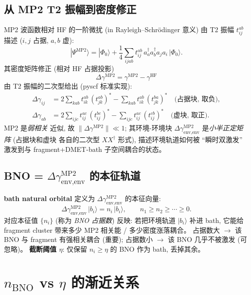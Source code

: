 \documentclass[11pt]{article}
\begin{document}
\subsection*{从 MP2 T2 振幅到密度修正}
MP2 波函数相对 HF 的一阶微扰 (in Rayleigh--Schr\"odinger 意义) 由
T2 振幅 $t_{ij}^{ab}$ 描述 ($i,j$ 占据, $a,b$ 虚):
\[
  |\Psi^{\text{MP2}}\rangle = |\Phi_0\rangle + \frac{1}{4}\sum_{ijab} t_{ij}^{ab}\,
  a^\dagger_a a^\dagger_b a_j a_i\,|\Phi_0\rangle .
\]
其密度矩阵修正 (相对 HF 占据投影)
\[
  \Delta\gamma^{\text{MP2}}
  = \gamma^{\text{MP2}}-\gamma^{\text{HF}}
\]
由 T2 振幅的二次型给出 (pyscf 标准实现):
\begin{align}
  \Delta\gamma_{ij}  &= 2\sum_{kab} t_{ik}^{ab}\,(t_{jk}^{ab})^*
                    - \sum_{kab} t_{ik}^{ab}\,(t_{jk}^{ba})^*  \quad \text{(占据块, 取负)},\\
  \Delta\gamma_{ab}  &= 2\sum_{ijc} t_{ij}^{ac}\,(t_{ij}^{bc})^*
                    - \sum_{ijc} t_{ij}^{ac}\,(t_{ij}^{cb})^*  \quad \text{(虚块, 取正)}.
\end{align}
MP2 是\emph{弱相关} 近似, 故 $\|\Delta\gamma^{\text{MP2}}\|\ll 1$; 其环境-环境块
$\Delta\gamma^{\text{MP2}}_{\text{env,env}}$ 是\emph{小半正定矩阵} (占据块和虚块
各自的二次型 $XX^\dagger$ 形式), 描述环境轨道如何被 ``瞬时双激发'' 激发到与
fragment+DMET-bath 子空间耦合的状态。

\subsection*{BNO = $\Delta\gamma^{\text{MP2}}_{\text{env,env}}$ 的本征轨道}
\textbf{bath natural orbital} 定义为 $\Delta\gamma^{\text{MP2}}_{\text{env,env}}$
的本征向量:
\[
  \Delta\gamma^{\text{MP2}}_{\text{env,env}}\,|b_i\rangle = n_i\,|b_i\rangle,
  \qquad n_1\ge n_2\ge\cdots\ge 0.
\]
对应本征值 $\{n_i\}$ (称为 \emph{BNO 占据数}) 反映: 若把环境轨道 $|b_i\rangle$
补进 bath, 它能给 fragment cluster 带来多少 MP2 相关能 / 多少密度涨落耦合。
占据数大 $\to$ 该 BNO 与 fragment 有强相关耦合 (重要);
占据数小 $\to$ 该 BNO 几乎不被激发 (可忽略)。
\textbf{截断阈值 $\eta$}: 仅保留 $n_i\ge\eta$ 的 BNO 作为 bath, 丢掉其余。

\section{$n_{\text{BNO}}$ vs $\eta$ 的渐近关系}
\end{document}
